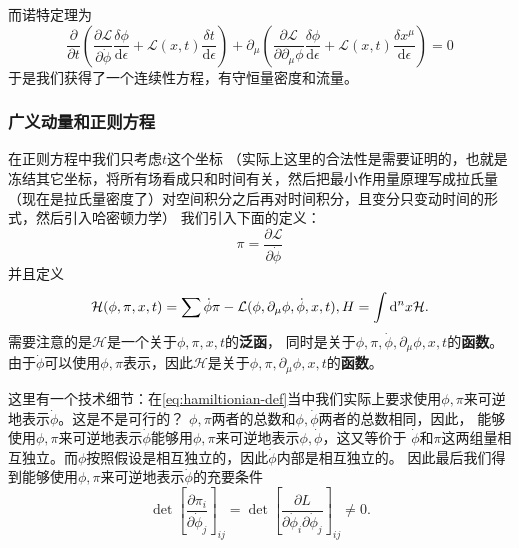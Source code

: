 \documentclass[UTF8, a4paper]{ctexart}
\begin{document}
而诺特定理为
\begin{equation}
    \frac{\partial}{\partial t} \left( \frac{\partial \mathcal{L}}{\partial \dot{\phi}} \frac{\delta \phi}{\mathrm{d} \epsilon} + \mathcal{L}(x, t) \frac{\delta t}{\mathrm{d} \epsilon} \right) + \partial_\mu \left( \frac{\partial \mathcal{L}}{\partial \partial_\mu \phi} \frac{\delta \phi}{\mathrm{d} \epsilon} + \mathcal{L}(x, t) \frac{\delta x^\mu}{\mathrm{d} \epsilon} \right) = 0
\end{equation}
于是我们获得了一个连续性方程，有守恒量密度和流量。

\subsubsection{广义动量和正则方程}
在正则方程中我们只考虑$t$这个坐标
（实际上这里的合法性是需要证明的，也就是冻结其它坐标，将所有场看成只和时间有关，然后把最小作用量原理写成拉氏量（现在是拉氏量密度了）对空间积分之后再对时间积分，且变分只变动时间的形式，然后引入哈密顿力学）
我们引入下面的定义：
\begin{equation}
    \pi = \frac{\partial \mathcal{L}}{\partial \dot{\phi}}
    \label{eq:generalized-momentum-def}
\end{equation}
并且定义
\begin{equation}
    \mathcal{H}(\phi, \pi, x, t) = \sum \dot{\phi} \pi - \mathcal{L}(\phi, \partial_\mu \phi, \dot{\phi}, x, t), \\
    H = \int \mathrm{d}^n x \mathcal{H}.
    \label{eq:hamiltionian-def}
\end{equation}
需要注意的是$\mathcal{H}$是一个关于$\phi, \pi, x, t$的\textbf{泛函}，
同时是关于$\phi, \pi, \dot{\phi}, \partial_\mu \phi, x, t$的\textbf{函数}。
由于$\dot{\phi}$可以使用$\phi, \pi$表示，因此$\mathcal{H}$是关于$\phi, \pi,  \partial_\mu \phi, x, t$的\textbf{函数}。

这里有一个技术细节：在\eqref{eq:hamiltionian-def}当中我们实际上要求使用$\phi, \pi$来可逆地表示$\dot{\phi}$。这是不是可行的？
$\phi, \pi$两者的总数和$\phi, \dot{\phi}$两者的总数相同，因此，
能够使用$\phi, \pi$来可逆地表示$\dot{\phi}$能够用$\phi, \pi$来可逆地表示$\phi, \dot{\phi}$，这又等价于
$\dot{\phi}$和$\pi$这两组量相互独立。而$\phi$按照假设是相互独立的，因此$\dot{\phi}$内部是相互独立的。
因此最后我们得到能够使用$\phi, \pi$来可逆地表示$\dot{\phi}$的充要条件
\begin{equation}
    \det \left[ \frac{\partial \pi_i}{\partial \dot{\phi}_j} \right]_{ij}
    = \det \left[ \frac{\partial L}{\partial \dot{\phi}_i \partial \dot{\phi}_j} \right]_{ij} \neq 0.
\end{equation}
\end{document}
